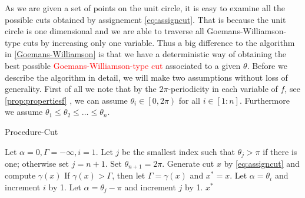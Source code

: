 \documentclass[12pt,a4paper]{article}
\theoremstyle{mythm}
\begin{document}
As we are given a set of points on the unit circle, it is easy to examine all the possible cuts obtained by assignement \ref{eq:assigncut}. 
That is because the unit circle is one dimensional and we are able to traverse all Goemans-Williamson-type cuts by increasing only one variable.
Thus a big difference to the algorithm in \ref{Goemans-Williamson} is that we have a deterministic way of obtaining the best possible \textcolor{red}{Goemans-Williamson-type
cut} associated to a given $ \theta $.
Before we describe the algorithm in detail, we will make two assumptions without loss of generality.
First of all we note that by the $ 2\pi $-periodicity in each variable of $ f $, see \ref{prop:propertiesf} , we can assume $ \theta_i \in \left[ 0,2\pi \right)  $ for all $ i
\in \left[ 1:n \right]  $.
Furthermore we assume $ \theta_1 \leq \theta_2 \leq \dots \leq \theta_n  $.
\begin{algorithm}
\caption{Procedure-Cut}
\label{alg:ProcedureCUT} 
\begin{algorithmic}[1]
\State Let $ \alpha =0, \Gamma = -\infty , i =1 $. Let $ j $ be the smallest index such that $ \theta_j > \pi $ if there is one; otherwise set $ j = n+1 $. Set $ \theta _{ n+1
} = 2\pi $.
\While{ $ \alpha < \pi $}
\State Generate cut $ x $ by \ref{eq:assigncut} and compute $ \gamma (x) $
\label{gencut} 
\State If $ \gamma (x) > \Gamma $, then let $ \Gamma = \gamma (x) $ and $ x^* = x $.
  \State Let $ \alpha = \theta_i $ and increment $ i $ by 1.
\Else 
\State Let $ \alpha = \theta_j - \pi $ and increment $ j $ by 1.
\EndIf
\EndWhile
\State \Return $ x ^{ * }  $
\end{algorithmic}
\end{algorithm}
\end{document}
